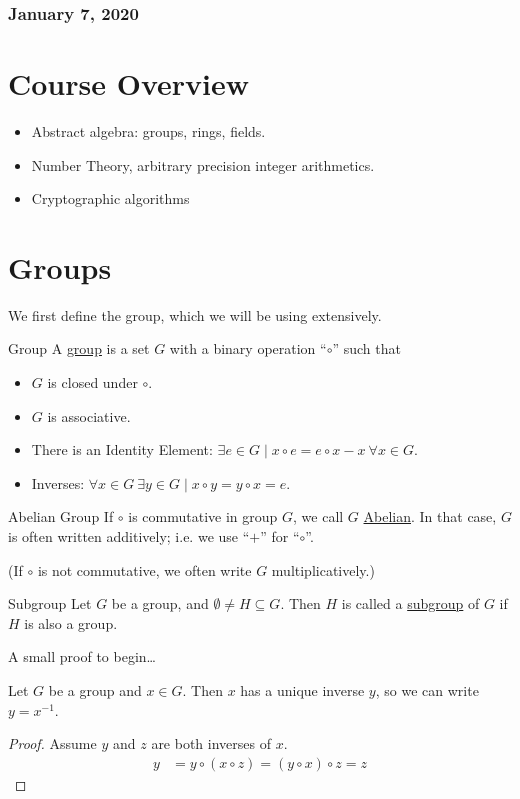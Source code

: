 \subsubsection*{January 7, 2020}
\section*{Course Overview}
\begin{itemize}
	\item Abstract algebra: groups, rings, fields.
	\item Number Theory, arbitrary precision integer arithmetics. 
	\item Cryptographic algorithms
\end{itemize}
\section{Groups}
We first define the group, which we will be using extensively. 
\begin{defn}{Group}
	A \ul{group} is a set $G$ with a binary operation ``$\circ$'' such that
	\begin{itemize}
		\item $G$ is closed under $\circ$.
		\item $G$ is associative. 
		\item There is an Identity Element: $\exists e\in G \mid x\circ e = e\circ x - x \ \forall x\in G$. 
		\item Inverses: $\forall x \in G\ \exists y\in G\mid x\circ y = y \circ x = e$. 
	\end{itemize}
\end{defn}

\begin{defn}{Abelian Group}
If $\circ$ is commutative in group $G$, we call $G$ \ul{Abelian}. In that case, $G$ is often written additively; i.e. we use ``$+$'' for ``$\circ$''.

(If $\circ$ is not commutative, we often write $G$ multiplicatively.)	
\end{defn}

\begin{defn}{Subgroup}
Let $G$ be a group, and $\emptyset\neq H \subseteq G$. Then $H$ is called a \ul{subgroup} of $G$ if $H$ is also a group. 
\end{defn}

A small proof to begin\dots 
\begin{proposition}
Let $G$ be a group and $x\in G$. Then $x$ has a unique inverse $y$, so we can write $y=x^{-1}$. 
\end{proposition}
\begin{proof}
Assume $y$ and $z$ are both inverses of $x$. 
\begin{align*}
y &= y \circ (x\circ z) = (y\circ x) \circ z = z	
\end{align*}
\end{proof}

